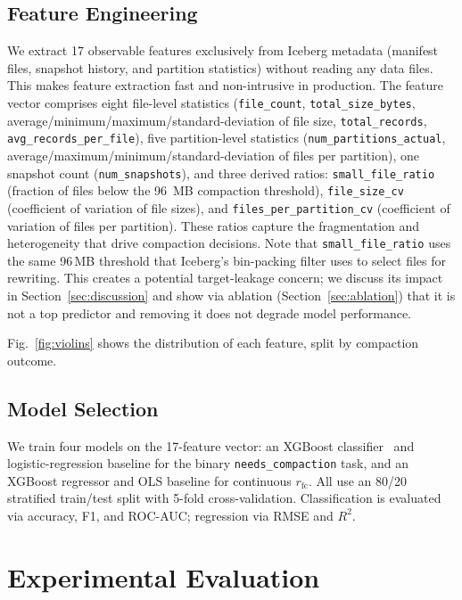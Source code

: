 \documentclass[conference, 10pt]{IEEEtran}
\begin{document}
\subsection{Feature Engineering}

We extract 17 observable features exclusively from Iceberg metadata (manifest
files, snapshot history, and partition statistics) without reading any data
files.  This makes feature extraction fast and non-intrusive in production.
The feature vector comprises eight file-level statistics (\texttt{file\_count},
\texttt{total\_size\_bytes}, average/minimum/maximum/standard-deviation of file
size, \texttt{total\_records}, \texttt{avg\_records\_per\_file}), five
partition-level statistics (\texttt{num\_partitions\_actual},
average/maximum/minimum/standard-deviation of files per partition), one
snapshot count (\texttt{num\_snapshots}), and three derived ratios:
\texttt{small\_file\_ratio} (fraction of files below the 96~MB compaction
threshold), \texttt{file\_size\_cv} (coefficient of variation of file sizes),
and \texttt{files\_per\_partition\_cv} (coefficient of variation of files per
partition).  These ratios capture the fragmentation and heterogeneity that
drive compaction decisions.
Note that \texttt{small\_file\_ratio} uses the same 96\,MB threshold that
Iceberg's bin-packing filter uses to select files for rewriting. This
creates a potential target-leakage concern; we discuss its impact in
Section~\ref{sec:discussion} and show via ablation
(Section~\ref{sec:ablation}) that it is not a top predictor and
removing it does not degrade model performance.

Fig.~\ref{fig:violins} shows the distribution of each feature, split by
compaction outcome.




\subsection{Model Selection}

We train four models on the 17-feature vector: an XGBoost
classifier~\cite{chen2016xgboost} and logistic-regression baseline for the
binary \texttt{needs\_compaction} task, and an XGBoost regressor and OLS
baseline for continuous $r_\mathrm{fc}$. All use an 80/20 stratified
train/test split with 5-fold cross-validation. Classification is evaluated
via accuracy, F1, and ROC-AUC; regression via RMSE and $R^2$.

\section{Experimental Evaluation}
\end{document}
